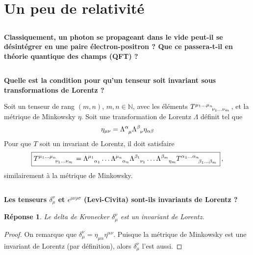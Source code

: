 \documentclass{article}
\numberwithin{equation}{section}
\theoremstyle{solution}
\newtheorem{solution}{Réponse}[section]
\begin{document}
\section{Un peu de relativité}

\subsection{}
\textbf{Classiquement, un photon se propageant dans le vide peut-il se désintégrer en une paire
électron-positron ? 
Que ce passera-t-il en théorie quantique des champs (QFT) ?}
\subsection{}
\textbf{Quelle est la condition pour qu’un tenseur soit invariant sous transformations de Lorentz ?}
\vspace{2ex}

Soit un tenseur de rang $(m,n)$, $m,n \in \mathbb{N}$, avec les éléments $T\indices{^{\mu_1\dots \mu_n}_{\nu_1\dots\nu_m}}$, et la métrique de Minkowsky $\eta$. Soit une transformation de 
Lorentz $\Lambda$ définit tel que
\begin{equation}
        \eta_{\mu \nu} = \Lambda\indices{^\alpha_\mu} \Lambda\indices{^\beta_\nu} \eta_{\alpha\beta}
\end{equation} 
Pour que $T$ soit un invariant de Lorentz, il doit satisfaire
\begin{equation}
        \boxed{ T\indices{^{\mu_1\dots\mu_n}_{\nu_1\dots\nu_m}} = \Lambda\indices{^{\mu_1}_{\alpha_1}} \dots \Lambda\indices{^{\mu_n}_{\alpha_n}} 
        \Lambda\indices{^{\beta_1}_{\nu_1}} \dots \Lambda\indices{^{\beta_m}_{\eta_m}} T\indices{^{\alpha_1\dots \alpha_n}_{\beta_1 \dots \beta_m}}} \, ,
\end{equation}
similairement à la métrique de Minkowsky.

\subsection{}
\textbf{Les tenseurs $\delta_{\mu}^{\nu}$ et  $\epsilon^{\mu\nu\rho\sigma}$ (Levi-Civita) sont-ils invariants de Lorentz ?}
\vspace{2ex}
\begin{solution}
        Le delta de Kronecker $\delta_\mu^{\nu}$ est un invariant de Lorentz.
\end{solution}
\begin{proof}
On remarque que $\delta^{\nu}_{\mu} = \eta_{\mu \alpha} \eta^{\alpha\nu}$. Puisque la métrique de Minkowsky est une invariant de 
Lorentz (par définition), alors $\delta^{\nu}_{\mu}$ l'est aussi.
\end{proof}
        
\end{document}
